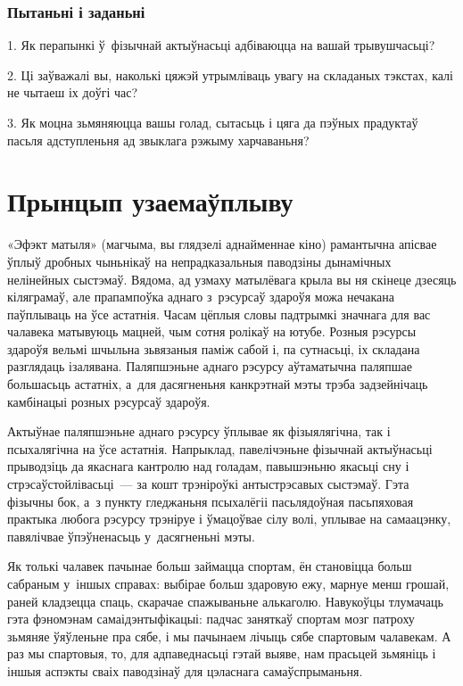 \subsubsection{Пытаньні і заданьні}

1. Як перапынкі ў~фізычнай актыўнасьці адбіваюцца на вашай трывушчасьці?

2. Ці заўважалі вы, наколькі цяжэй утрымліваць увагу на складаных тэкстах, калі не чытаеш іх доўгі час?

3. Як моцна зьмяняюцца вашы голад, сытасьць і цяга да пэўных прадуктаў пасьля адступленьня ад звыклага рэжыму харчаваньня?


\section{Прынцып узаемаўплыву}

«Эфэкт матыля» (магчыма, вы глядзелі аднайменнае кіно) рамантычна апісвае ўплыў дробных чыньнікаў на непрадказальныя паводзіны дынамічных нелінейных сыстэмаў. Вядома, ад узмаху матылёвага крыла вы ня скінеце дзесяць кіляграмаў, але прапампоўка аднаго з~рэсурсаў здароўя можа нечакана паўплываць на ўсе астатнія. Часам цёплыя словы падтрымкі значнага для вас чалавека матывуюць мацней, чым сотня ролікаў на ютубе. Розныя рэсурсы здароўя вельмі шчыльна зьвязаныя паміж сабой і, па сутнасьці, іх складана разглядаць ізалявана. Паляпшэньне аднаго рэсурсу аўтаматычна паляпшае большасьць астатніх, а~для дасягненьня канкрэтнай мэты трэба задзейнічаць камбінацыі розных рэсурсаў здароўя.

Актыўнае паляпшэньне аднаго рэсурсу ўплывае як фізыялягічна, так і псыхалягічна на ўсе астатнія. Напрыклад, павелічэньне фізычнай актыўнасьці прыводзіць да якаснага кантролю над голадам, павышэньню якасьці сну і стрэсаўстойлівасьці~--- за кошт трэніроўкі антыстрэсавых сыстэмаў. Гэта фізычны бок, а~з пункту гледжаньня псыхалёгіі пасьлядоўная пасьпяховая практыка любога рэсурсу трэніруе і ўмацоўвае сілу волі, уплывае на самаацэнку, павялічвае ўпэўненасьць у~дасягненьні мэты.

Як толькі чалавек пачынае больш займацца спортам, ён становіцца больш сабраным у~іншых справах: выбірае больш здаровую ежу, марнуе менш грошай, раней кладзецца спаць, скарачае спажываньне алькаголю. Навукоўцы тлумачаць гэта фэномэнам самаідэнтыфікацыі: падчас заняткаў спортам мозг патроху зьмяняе ўяўленьне пра сябе, і мы пачынаем лічыць сябе спартовым чалавекам. А раз мы спартовыя, то, для адпаведнасьці гэтай выяве, нам прасьцей зьмяніць і іншыя аспэкты сваіх паводзінаў для цэласнага самаўспрыманьня.

